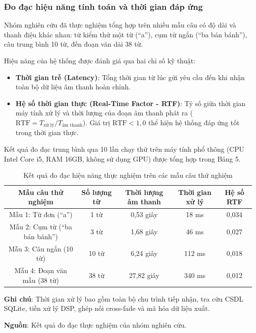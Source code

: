 \subsubsection{Đo đạc hiệu năng tính toán và thời gian đáp ứng}
Nhóm nghiên cứu đã thực nghiệm tổng hợp trên nhiều mẫu câu có độ dài và thanh điệu khác nhau: từ kiểm thử một từ (``a''), cụm từ ngắn (``ba bán bánh''), câu trung bình 10 từ, đến đoạn văn dài 38 từ.

Hiệu năng của hệ thống được đánh giá qua hai chỉ số kỹ thuật:
\begin{itemize}
    \item \textbf{Thời gian trễ (Latency)}: Tổng thời gian từ lúc gửi yêu cầu đến khi nhận toàn bộ dữ liệu âm thanh hoàn chỉnh.
    \item \textbf{Hệ số thời gian thực (Real-Time Factor - RTF)}: Tỷ số giữa thời gian máy tính xử lý và thời lượng của đoạn âm thanh phát ra ($\text{RTF} = T_{\text{xử lý}} / T_{\text{âm thanh}}$). Giá trị $\text{RTF} < 1{,}0$ thể hiện hệ thống đáp ứng tốt trong thời gian thực.
\end{itemize}

Kết quả đo đạc trung bình qua 10 lần chạy thử trên máy tính phổ thông (CPU Intel Core i5, RAM 16GB, không sử dụng GPU) được tổng hợp trong Bảng 5.

\begin{table}[H]
\centering
\caption{Kết quả đo đạc hiệu năng thực nghiệm trên các mẫu câu thử nghiệm}
\label{tab:performance_eval}
\vspace{2pt}
\begin{tabular}{ccccc}
\toprule
\textbf{Mẫu câu thử nghiệm} & \textbf{Số lượng từ} & \textbf{Thời lượng âm thanh} & \textbf{Thời gian xử lý} & \textbf{Hệ số RTF} \\
\midrule
Mẫu 1: Từ đơn (``a'') & 1 từ & 0,53 giây & 18 ms & 0,034 \\
Mẫu 2: Cụm từ (``ba bán bánh'') & 3 từ & 1,68 giây & 46 ms & 0,027 \\
Mẫu 3: Câu ngắn (10 từ) & 10 từ & 6,24 giây & 112 ms & 0,018 \\
Mẫu 4: Đoạn văn mẫu (38 từ) & 38 từ & 27,82 giây & 340 ms & 0,012 \\
\bottomrule
\end{tabular}
\par\vspace{4pt}
\begin{minipage}{0.92\textwidth}
\fontsize{12}{14}\selectfont \textbf{Ghi chú}: Thời gian xử lý bao gồm toàn bộ chu trình tiếp nhận, tra cứu CSDL SQLite, tiền xử lý DSP, ghép nối cross-fade và mã hóa dữ liệu xuất.\par
\textbf{Nguồn}: Kết quả đo đạc thực nghiệm của nhóm nghiên cứu.
\end{minipage}
\end{table}


